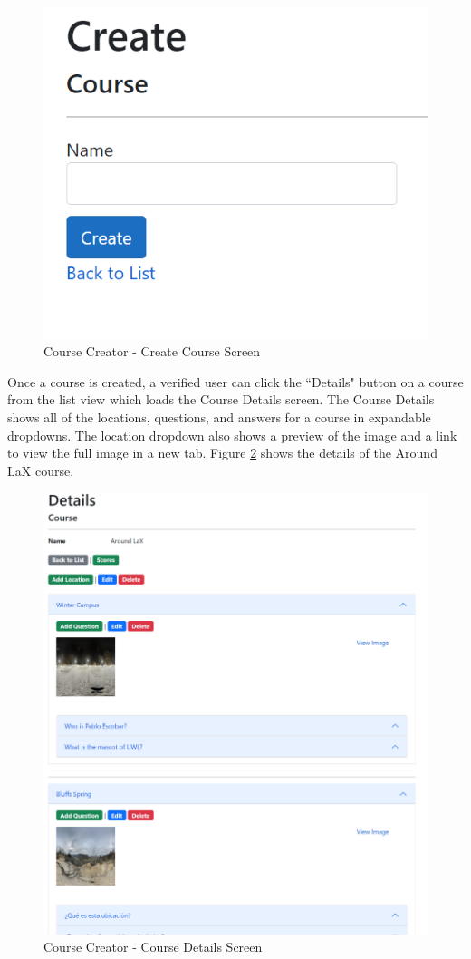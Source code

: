 \begin{figure}[htb]
	\centering
	\includegraphics[width=.6\textwidth]{Requirements/assets/cc-create-course.png}
	\caption[Course Creator - Create Course Screen]{\label{CC Create Course}Course Creator - Create Course Screen}
\end{figure}
\clearpage
Once a course is created, a verified user can click the ``Details" button on a course from the list view which loads the Course Details screen. The Course Details shows all of the locations, questions, and answers for a course in expandable dropdowns. The location dropdown also shows a preview of the image and a link to view the full image in a new tab. Figure \ref{CC Course Dashboard} shows the details of the Around LaX course.
\\
\begin{figure}[htb]
	\centering
	\includegraphics[width=.6\textwidth]{Requirements/assets/cc-course-dashboard.png}
	\caption[Course Creator - Course Details Screen]{\label{CC Course Dashboard}Course Creator - Course Details Screen}
\end{figure}
